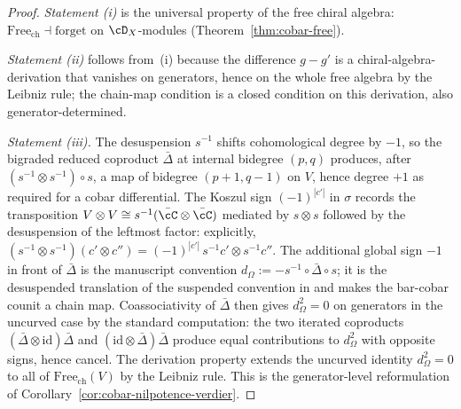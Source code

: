 \begin{proof}
\emph{Statement (i)} is the universal property of the free chiral algebra:
$\mathrm{Free}_{\mathrm{ch}} \dashv \mathrm{forget}$ on $\cD_X$-modules
\textup{(}Theorem~\ref{thm:cobar-free}\textup{)}.

\emph{Statement (ii)} follows from~(i) because the difference $g - g'$ is a
chiral-algebra-derivation that vanishes on generators, hence on the whole
free algebra by the Leibniz rule; the chain-map condition is a closed
condition on this derivation, also generator-determined.

\emph{Statement (iii).}
The desuspension $s^{-1}$ shifts cohomological degree by $-1$, so the
bigraded reduced coproduct $\bar{\Delta}$ at internal bidegree $(p,q)$
produces, after $(s^{-1}\otimes s^{-1}) \circ s$, a map of bidegree
$(p+1, q-1)$ on $V$, hence degree $+1$ as required for a cobar differential.
The Koszul sign $(-1)^{|c'|}$ in $\sigma$ records the transposition
$V \otimes V \cong s^{-1}(\bar{\cC} \otimes \bar{\cC})$ mediated by
$s \otimes s$ followed by the desuspension of the leftmost factor:
explicitly, $(s^{-1} \otimes s^{-1})(c' \otimes c'') = (-1)^{|c'|}\,
s^{-1}c' \otimes s^{-1}c''$.
The additional global sign $-1$ in front of $\bar{\Delta}$ is the
manuscript convention
$d_\Omega := -s^{-1} \circ \bar{\Delta} \circ s$; it is the
desuspended translation of the suspended convention in
\cite[\S2.2]{LV12} and makes the bar-cobar counit a chain map.
Coassociativity of $\bar{\Delta}$ then gives $d_\Omega^2 = 0$ on
generators in the uncurved case by the standard
\cite[Proposition~2.2.6]{LV12} computation:
the two iterated coproducts $(\bar{\Delta} \otimes \mathrm{id}) \bar{\Delta}$
and $(\mathrm{id} \otimes \bar{\Delta}) \bar{\Delta}$ produce equal
contributions to $d_\Omega^2$ with opposite signs, hence cancel. The
derivation property extends the uncurved identity $d_\Omega^2 = 0$ to all of
$\mathrm{Free}_{\mathrm{ch}}(V)$ by the Leibniz rule. This is the
generator-level reformulation of
Corollary~\ref{cor:cobar-nilpotence-verdier}.
\end{proof}

